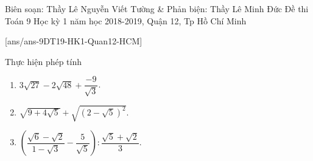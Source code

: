 \begin{name}
{Biên soạn: Thầy Lê Nguyễn Viết Tường \& Phản biện: Thầy Lê Minh Đức}
{Đề thi Toán 9 Học kỳ 1 năm học 2018-2019, Quận 12, Tp Hồ Chí Minh }
\end{name}
\setcounter{bt}{0}
[ans/ans-9DT19-HK1-Quan12-HCM]
\begin{bt}%
Thực hiện phép tính
\begin{enumerate}
\item $3\sqrt{27}-2\sqrt{48}+\dfrac{-9}{\sqrt{3}}$.
\item $\sqrt{9+4\sqrt{5}}+\sqrt{\left(2-\sqrt{5}\right) ^2}$.
\item $\left(\dfrac{\sqrt{6}-\sqrt{2}}{1-\sqrt{3}}-\dfrac{5}{\sqrt{5}}\right) :\dfrac{\sqrt{5}+\sqrt{2}}{3}$.
\end{enumerate}
\end{bt}

